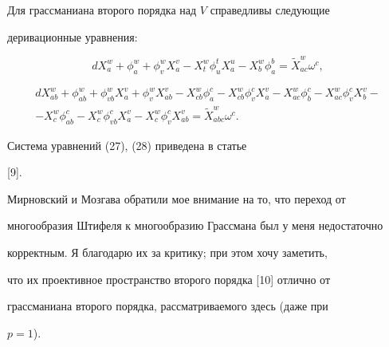 Для грассманиана второго порядка над $V$ справедливы следующие


деривационные уравнения:


\begin{equation}


dX^w_a + \phi^w_a + \phi^w_v X^v_a - X^w_t \phi^t_u X^u_a -


X^w_b \phi^b_a = {\widetilde X}^w_{ac} \omega^c,


\end{equation}


\begin{multline}


dX^w_{ab} + \phi^w_{ab} + \phi^w_{vb} X^v_a + \phi^w_v X^v_{ab} -


X^w_{cb} \phi^c_a - X^w_{cb} \phi^c_v X^v_a - X^w_{ac} \phi^c_b -


X^w_{ac}\phi^c_v X^v_b -\\


-X^w_c \phi^c_{ab} - X^w_c \phi^c_{vb} X^v_a -


X^w_c \phi^c_v X^v_{ab} = {\widetilde X}^w_{abc} \omega^c.


\end{multline}





\begin{notenonum} Система уравнений (27), (28) приведена в статье


[9].


Мирновский и Мозгава обратили мое внимание на то, что переход от


многообразия Штифеля к многообразию Грассмана был у меня недостаточно


корректным. Я благодарю их за критику; при этом хочу заметить,


что их проективное пространство второго порядка [10] отлично от


грассманиана второго порядка, рассматриваемого здесь (даже при


$p=1$).


\end{notenonum}





